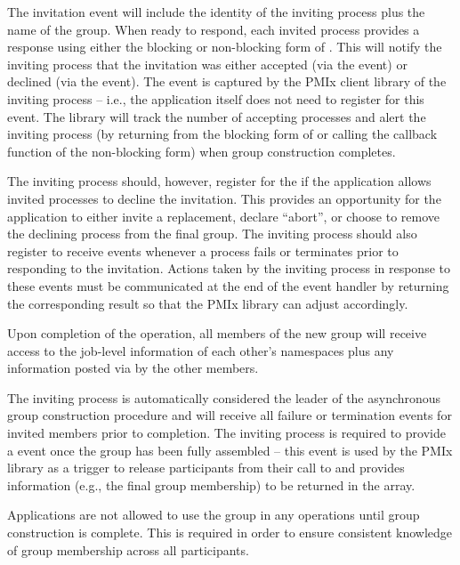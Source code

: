 The invitation event will include the identity of the inviting process plus the name of the group. When ready to respond, each invited process provides a response using either the blocking or non-blocking form of . This will notify the inviting process that the invitation was either accepted (via the  event) or declined (via the  event). The  event is captured by the \ac{PMIx} client library of the inviting process – i.e., the application itself does not need to register for this event. The library will track the number of accepting processes and alert the inviting process (by returning from the blocking form of  or calling the callback function of the non-blocking form) when group construction completes.

The inviting process should, however, register for the  if the application allows invited processes to decline the invitation. This provides an opportunity for the application to either invite a replacement, declare ``abort'', or choose to remove the declining process from the final group. The inviting process should also register to receive  events whenever a process fails or terminates prior to responding to the invitation. Actions taken by the inviting process in response to these events must be communicated at the end of the event handler by returning the corresponding result so that the \ac{PMIx} library can adjust accordingly.

Upon completion of the operation, all members of the new group will receive access to the job-level information of each other’s namespaces plus any information posted via  by the other members.

The inviting process is automatically considered the leader of the asynchronous group construction procedure and will receive all failure or termination events for invited members prior to completion. The inviting process is required to provide a  event once the group has been fully assembled – this event is used by the \ac{PMIx} library as a trigger to release participants from their call to  and provides information (e.g., the final group membership) to be returned in the  array.

\adviceuserstart
Applications are not allowed to use the group in any operations until group construction is complete. This is required in order to ensure consistent knowledge of group membership across all participants.
\adviceuserend

